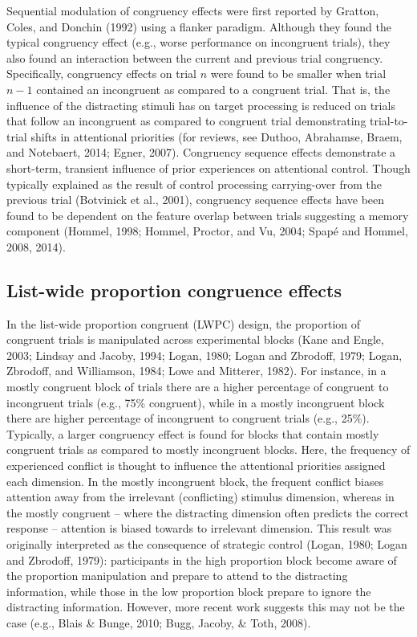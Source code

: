\documentclass[]{DissertateCUNY}
\begin{document}
Sequential modulation of congruency effects were first reported by
Gratton, Coles, and Donchin (1992) using a flanker paradigm. Although
they found the typical congruency effect (e.g., worse performance on
incongruent trials), they also found an interaction between the current
and previous trial congruency. Specifically, congruency effects on trial
\(n\) were found to be smaller when trial \(n-1\) contained an
incongruent as compared to a congruent trial. That is, the influence of
the distracting stimuli has on target processing is reduced on trials
that follow an incongruent as compared to congruent trial demonstrating
trial-to-trial shifts in attentional priorities (for reviews, see
Duthoo, Abrahamse, Braem, and Notebaert, 2014; Egner, 2007). Congruency
sequence effects demonstrate a short-term, transient influence of prior
experiences on attentional control. Though typically explained as the
result of control processing carrying-over from the previous trial
(Botvinick et al., 2001), congruency sequence effects have been found to
be dependent on the feature overlap between trials suggesting a memory
component (Hommel, 1998; Hommel, Proctor, and Vu, 2004; Spapé and
Hommel, 2008, 2014).

\hypertarget{list-wide-proportion-congruence-effects}{%
\subsection{List-wide proportion congruence
effects}\label{list-wide-proportion-congruence-effects}}

In the list-wide proportion congruent (LWPC) design, the proportion of
congruent trials is manipulated across experimental blocks (Kane and
Engle, 2003; Lindsay and Jacoby, 1994; Logan, 1980; Logan and Zbrodoff,
1979; Logan, Zbrodoff, and Williamson, 1984; Lowe and Mitterer, 1982).
For instance, in a mostly congruent block of trials there are a higher
percentage of congruent to incongruent trials (e.g., 75\% congruent),
while in a mostly incongruent block there are higher percentage of
incongruent to congruent trials (e.g., 25\%). Typically, a larger
congruency effect is found for blocks that contain mostly congruent
trials as compared to mostly incongruent blocks. Here, the frequency of
experienced conflict is thought to influence the attentional priorities
assigned each dimension. In the mostly incongruent block, the frequent
conflict biases attention away from the irrelevant (conflicting)
stimulus dimension, whereas in the mostly congruent -- where the
distracting dimension often predicts the correct response -- attention
is biased towards to irrelevant dimension. This result was originally
interpreted as the consequence of strategic control (Logan, 1980; Logan
and Zbrodoff, 1979): participants in the high proportion block become
aware of the proportion manipulation and prepare to attend to the
distracting information, while those in the low proportion block prepare
to ignore the distracting information. However, more recent work
suggests this may not be the case (e.g., Blais \& Bunge, 2010; Bugg,
Jacoby, \& Toth, 2008).
\end{document}
